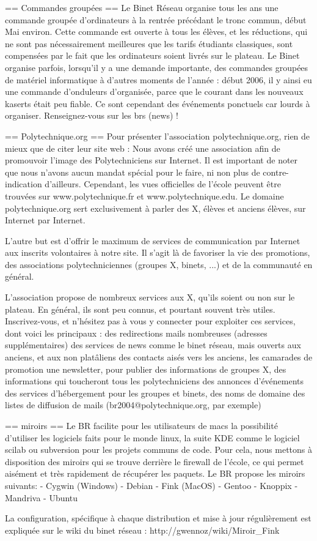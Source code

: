 == Commandes groupées ==
Le Binet Réseau organise tous les ans une commande groupée d'ordinateurs à la rentrée
précédant le tronc commun, début Mai environ. Cette commande est ouverte à tous les élèves,
et les réductions, qui ne sont pas nécessairement meilleures que les tarifs étudiants
classiques, sont compensées par le fait que les ordinateurs soient livrés sur le plateau.
Le Binet organise parfois, lorsqu'il y a une demande importante, des commandes groupées
de matériel informatique à d'autres moments de l'année : début 2006, il y ainsi eu une
commande d'onduleurs d'organisée, parce que le courant dans les nouveaux kaserts était
peu fiable. Ce sont cependant des événements ponctuels car lourds à organiser.
Renseignez-vous sur les brs (news) !

== Polytechnique.org ==
Pour présenter l'association polytechnique.org, rien de mieux que de citer leur site web :
  Nous avons créé une association afin de promouvoir l'image des Polytechniciens sur Internet.
  Il est important de noter que nous n'avons aucun mandat spécial pour le faire, ni non plus
  de contre-indication d'ailleurs. Cependant, les vues officielles de l'école peuvent être
  trouvées sur www.polytechnique.fr et www.polytechnique.edu. Le domaine polytechnique.org sert
  exclusivement à parler des X, élèves et anciens élèves, sur Internet par Internet.

  L'autre but est d'offrir le maximum de services de communication par Internet aux inscrits
  volontaires à notre site. Il s'agit là de favoriser la vie des promotions, des associations
  polytechniciennes (groupes X, binets, ...) et de la communauté en général.

L'association propose de nombreux services aux X, qu'ils soient ou non sur le plateau.
En général, ils sont peu connus, et pourtant souvent très utiles. Inscrivez-vous, et n'hésitez
pas à vous y connecter pour exploiter ces services, dont voici les principaux :
  des redirections mails nombreuses (adresses supplémentaires)
  des services de news comme le binet réseau, mais ouverts aux anciens, et aux non platâliens
  des contacts aisés vers les anciens, les camarades de promotion
  une newsletter, pour publier des informations de groupes X, des informations qui toucheront tous les polytechniciens
  des annonces d'événements
  des services d'hébergement pour les groupes et binets, des noms de domaine
  des listes de diffusion de mails (br2004@polytechnique.org, par exemple)

== miroirs == 
Le BR facilite pour les utilisateurs de macs la possibilité d'utiliser les logiciels faits pour le monde linux, la suite KDE comme le logiciel scilab ou subversion pour les projets communs de code. Pour cela, nous mettons à disposition des miroirs qui se trouve derrière le firewall de l'école, ce qui permet aisément et très rapidement de récupérer les paquets. Le BR propose les miroirs suivants:
	- Cygwin (Windows)
	- Debian
	- Fink (MacOS)
	- Gentoo
	- Knoppix
	- Mandriva
	- Ubuntu
	
La configuration, spécifique à chaque distribution et mise à jour régulièrement est expliquée sur le wiki du binet réseau : 
http://gwennoz/wiki/Miroir_Fink